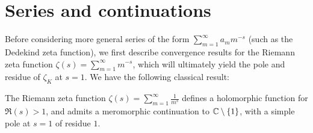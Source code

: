 \documentclass[11pt]{report}
\begin{document}
\section{Series and continuations} %
Before considering more general series of the form $\sum_{m = 1}^\infty a_mm^{-s}$ (such as the Dedekind zeta function), we first describe convergence results for the Riemann zeta function $\zeta(s) = \sum_{m = 1}^\infty m^{-s}$, which will ultimately yield the pole and residue of $\zeta_K$ at $s = 1$. We have the following classical result:
\begin{lemma}
    The Riemann zeta function $\zeta(s) = \sum_{m = 1}^\infty \frac1{m^s}$ defines a holomorphic function for $\Re(s) > 1$, and admits a meromorphic continuation to $\mathbb{C} \setminus \left\{  1  \right\}$, with a simple pole at $s = 1$ of residue $1$.
\end{lemma}
\end{document}
